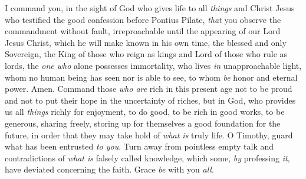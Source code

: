 \begin{biblechapter}
\verse I command you, in the sight of God who gives life to all \textit{things} and Christ Jesus who testified the good confession before Pontius Pilate,
\verse \textit{that} you observe the commandment without fault, irreproachable until the appearing of our Lord Jesus Christ,
\verse which he will make known in his own time, the blessed and only Sovereign, the King of those who reign as kings and Lord of those who rule as lords,
\verse the \textit{one who} alone possesses immortality, who lives \textit{in} unapproachable light, whom no human being has seen nor is able to see, to whom \textit{be} honor and eternal power. Amen.
 Command those \textit{who are} rich in this present age not to be proud and not to put their hope in the uncertainty of riches, but in God, who provides us all \textit{things} richly for enjoyment,
\verse to do good, to be rich in good works, to be generous, sharing freely,
\verse storing up for themselves a good foundation for the future, in order that they may take hold of \textit{what is} truly life.
 O Timothy, guard what has been entrusted \textit{to you}. Turn away from pointless empty talk and contradictions of \textit{what is} falsely called knowledge,
\verse which some, \textit{by} professing \textit{it}, have deviated concerning the faith. Grace \textit{be} with you \textit{all}.
\end{biblechapter}

